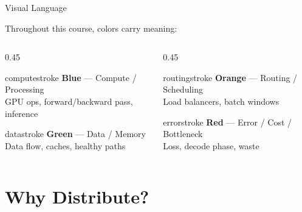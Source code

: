 \documentclass[aspectratio=169, 12pt]{beamer}
\begin{document}
\begin{frame}{Visual Language}
\note{
[0.5 min]
}

\small
Throughout this course, colors carry meaning:

\vspace{0.3cm}
\begin{columns}[T]
  \begin{column}{0.45\textwidth}
    \begin{mlsyscard}{computestroke}
    \textbf{Blue} --- Compute / Processing\\
    {\footnotesize GPU ops, forward/backward pass, inference}
    \end{mlsyscard}
    \vspace{0.15cm}
    \begin{mlsyscard}{datastroke}
    \textbf{Green} --- Data / Memory\\
    {\footnotesize Data flow, caches, healthy paths}
    \end{mlsyscard}
  \end{column}
  \begin{column}{0.45\textwidth}
    \begin{mlsyscard}{routingstroke}
    \textbf{Orange} --- Routing / Scheduling\\
    {\footnotesize Load balancers, batch windows}
    \end{mlsyscard}
    \vspace{0.15cm}
    \begin{mlsyscard}{errorstroke}
    \textbf{Red} --- Error / Cost / Bottleneck\\
    {\footnotesize Loss, decode phase, waste}
    \end{mlsyscard}
  \end{column}
\end{columns}
\end{frame}



\section{Why Distribute?}
\end{document}
